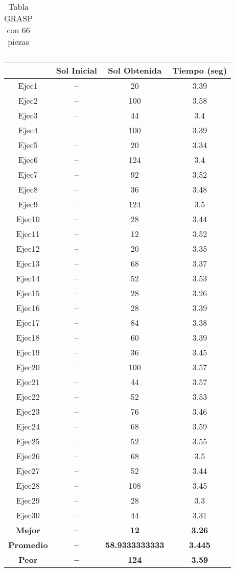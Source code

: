 \begin{center}
\begin{table}
\begin{tabular}{|c|c|c|c|}
\end{tabular} 
\caption{Tabla GRASP con 66 piezas}
\end{table}

\begin{table}

\begin{tabular}{|c|c|c|c|}



\hline
 & {\bf Sol Inicial} & {\bf Sol Obtenida} & {\bf Tiempo (seg)} \\
\hline
Ejec1 & -- & 20  & 3.39 \\
\hline
Ejec2 & -- & 100  & 3.58 \\
\hline
Ejec3 & -- & 44  & 3.4 \\
\hline
Ejec4 & -- & 100  & 3.39 \\
\hline
Ejec5 & -- & 20  & 3.34 \\
\hline
Ejec6 & -- & 124  & 3.4 \\
\hline
Ejec7 & -- & 92  & 3.52 \\
\hline
Ejec8 & -- & 36  & 3.48 \\
\hline
Ejec9 & -- & 124  & 3.5 \\
\hline
Ejec10 & -- & 28  & 3.44 \\
\hline
Ejec11 & -- & 12  & 3.52 \\
\hline
Ejec12 & -- & 20  & 3.35 \\
\hline
Ejec13 & -- & 68  & 3.37 \\
\hline
Ejec14 & -- & 52  & 3.53 \\
\hline
Ejec15 & -- & 28  & 3.26 \\
\hline
Ejec16 & -- & 28  & 3.39 \\
\hline
Ejec17 & -- & 84  & 3.38 \\
\hline
Ejec18 & -- & 60  & 3.39 \\
\hline
Ejec19 & -- & 36  & 3.45 \\
\hline
Ejec20 & -- & 100  & 3.57 \\
\hline
Ejec21 & -- & 44  & 3.57 \\
\hline
Ejec22 & -- & 52  & 3.53 \\
\hline
Ejec23 & -- & 76  & 3.46 \\
\hline
Ejec24 & -- & 68  & 3.59 \\
\hline
Ejec25 & -- & 52  & 3.55 \\
\hline
Ejec26 & -- & 68  & 3.5 \\
\hline
Ejec27 & -- & 52  & 3.44 \\
\hline
Ejec28 & -- & 108  & 3.45 \\
\hline
Ejec29 & -- & 28  & 3.3 \\
\hline
Ejec30 & -- & 44  & 3.31 \\
\hline
{\bf Mejor} & {\bf -- } & {\bf 12} & {\bf 3.26} \\
\hline
{\bf Promedio} & {\bf -- } & {\bf 58.9333333333} & {\bf 3.445} \\
\hline
{\bf Peor} & {\bf -- } & {\bf 124} & {\bf 3.59} \\
\hline


\end{tabular}
\end{table}
\end{center}
